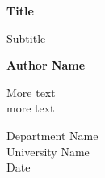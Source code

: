 \begin{titlepage}
    \begin{center}
        \vspace*{1cm}
        
        \Huge
        \textbf{Title}
        
        \vspace{0.5cm}
        \LARGE
        Subtitle
        
        \textbf{Author Name}
        
        \vfill
        
        More text \\
        more text
        
        \vspace{0.8cm}
        
        
        \Large
        Department Name \\
        University Name \\
        Date
        
    \end{center}

\end{titlepage}